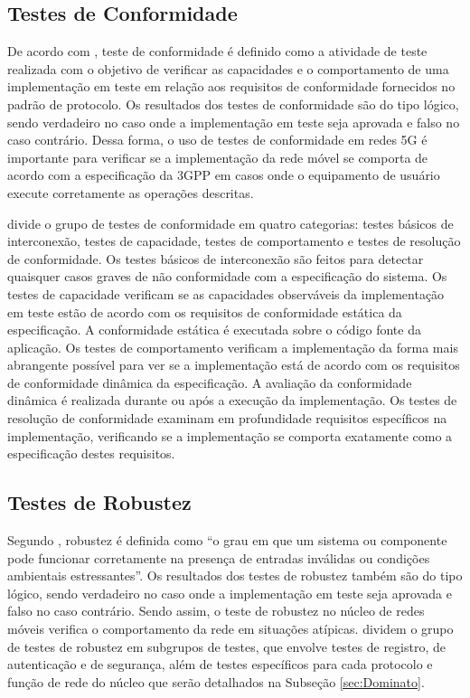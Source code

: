 \subsection{Testes de Conformidade}

De acordo com , teste de conformidade é definido como a atividade de teste realizada com o objetivo de verificar as capacidades e o comportamento de uma implementação em teste em relação aos requisitos de conformidade fornecidos no padrão de protocolo.
Os resultados dos testes de conformidade são do tipo lógico, sendo verdadeiro no caso onde a implementação em teste seja aprovada e falso no caso contrário.
Dessa forma, o uso de testes de conformidade em redes 5G é importante para verificar se a implementação da rede móvel se comporta de acordo com a especificação da 3GPP em casos onde o equipamento de usuário execute corretamente as operações descritas.

 divide o grupo de testes de conformidade em quatro categorias: testes básicos de interconexão, testes de capacidade, testes de comportamento e testes de resolução de conformidade.
Os testes básicos de interconexão são feitos para detectar quaisquer casos graves de não conformidade com a especificação do sistema.
Os testes de capacidade verificam se as capacidades observáveis da implementação em teste estão de acordo com os requisitos de conformidade estática da especificação. A conformidade estática é executada sobre o código fonte da aplicação.
Os testes de comportamento verificam a implementação da forma mais abrangente possível para ver se a implementação está de acordo com os requisitos de conformidade dinâmica da especificação. A avaliação da conformidade dinâmica é realizada durante ou após a execução da implementação.
Os testes de resolução de conformidade examinam em profundidade requisitos específicos na implementação, verificando se a implementação se comporta exatamente como a especificação destes requisitos.

\subsection{Testes de Robustez}

Segundo , robustez é definida como ``o grau em que um sistema ou componente pode funcionar corretamente na presença de entradas inválidas ou condições ambientais estressantes''.
Os resultados dos testes de robustez também são do tipo lógico, sendo verdadeiro no caso onde a implementação em teste seja aprovada e falso no caso contrário.
Sendo assim, o teste de robustez no núcleo de redes móveis verifica o comportamento da rede em situações atípicas.  dividem o grupo de testes de robustez em subgrupos de testes, que envolve testes de registro, de autenticação e de segurança, além de testes específicos para cada protocolo e função de rede do núcleo que serão detalhados na Subseção \ref{sec:Dominato}.

